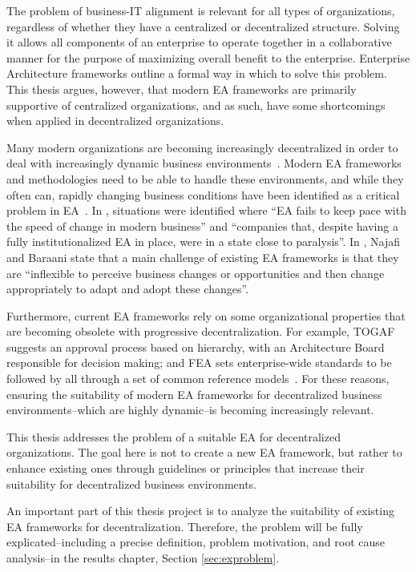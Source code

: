 The problem of business-IT alignment is relevant for all types of organizations, regardless of whether they have a centralized or decentralized structure. Solving it allows all components of an enterprise to operate together in a collaborative manner for the purpose of maximizing overall benefit to the enterprise. Enterprise Architecture frameworks outline a formal way in which to solve this problem. This thesis argues, however, that modern EA frameworks are primarily supportive of centralized organizations, and as such, have some shortcomings when applied in decentralized organizations. 

Many modern organizations are becoming increasingly decentralized in order to deal with increasingly dynamic business environments~\cite{fulk1995}. Modern EA frameworks and methodologies need to be able to handle these environments, and while they often can, rapidly changing business conditions have been identified as a critical problem in EA~\cite{kaisler2005ea,lucke2010critical}. In \cite[Ch. 1]{Bente2012}, situations were identified where ``EA fails to keep pace with the speed of change in modern business'' and ``companies that, despite having a fully institutionalized EA in place, were in a state close to paralysis''. In \cite{najafi2010kasra}, Najafi and Baraani state that a main challenge of existing EA frameworks is that they are ``inflexible to perceive business changes or opportunities and then change appropriately to adapt and adopt these changes''.

Furthermore, current EA frameworks rely on some organizational properties that are becoming obsolete with progressive decentralization. For example, TOGAF~\cite[Ch. 47]{togaf9.1} suggests an approval process based on hierarchy, with an Architecture Board responsible for decision making; and FEA sets enterprise-wide standards to be followed by all through a set of common reference models~\cite{sessions2007}. For these reasons, ensuring the suitability of modern EA frameworks for  decentralized business environments--which are highly dynamic--is becoming increasingly relevant. 

This thesis addresses the problem of a suitable EA for decentralized organizations. The goal here is not to create a new EA framework, but rather to enhance existing ones through guidelines or principles that increase their suitability for decentralized business environments.

An important part of this thesis project is to analyze the suitability of existing EA frameworks for decentralization. Therefore, the problem will be fully explicated--including a precise definition, problem motivation, and root cause analysis--in the results chapter, Section \ref{sec:exproblem}.

